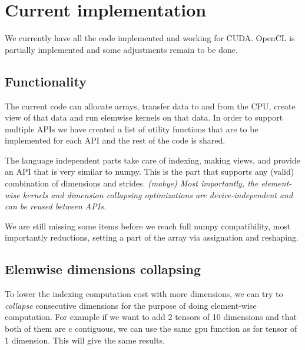 \documentclass{article} %
\begin{document}
\section{Current implementation}

We currently have all the code implemented and working for CUDA.  
OpenCL is partially implemented and some adjustments remain to be done.  

\subsection{Functionality}

The current code can allocate arrays, transfer data to and from the CPU, create view of that data and run elemwise kernels on that data.  In order to support multiple APIs we have created a list of utility functions that are to be implemented for each API and the rest of the code is shared.

The language independent parts take care of indexing, making views, and provide an API that is very similar to numpy.  This is the part that supports any (valid) combination of dimensions and strides.  \emph{(mabye) Most importantly, the element-wise kernels and dimension collapsing optimizations are device-independent and can be reused between APIs.}

We are still missing some items before we reach full numpy compatibility, most importantly reductions, setting a part of the array via assignation and reshaping.

\subsection{Elemwise dimensions collapsing}
To lower the indexing computation cost with more dimensions, we can
try to \emph{collapse} consecutive dimensions for the purpose of doing
element-wise computation. For example if we want to add 2 tensors of
10 dimensions and that both of them are c contiguous, we can use the
same gpu function as for tensor of 1 dimension. This will give the
same results.
\end{document}
